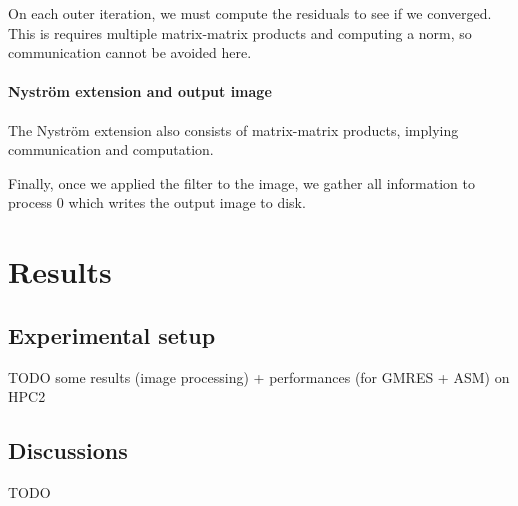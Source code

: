 On each outer iteration, we must compute the residuals to see if we converged.
This is requires multiple matrix-matrix products and computing a norm, so communication cannot be avoided here.

\paragraph{Nystr\"om extension and output image}
The Nystr\"om extension also consists of matrix-matrix products, implying communication and computation.

Finally, once we applied the filter to the image, we gather all information to process 0 which writes the output image to disk.

\section{Results}

\subsection{Experimental setup}
TODO some results (image processing) + performances (for GMRES + ASM) on HPC2

\subsection{Discussions}
TODO
